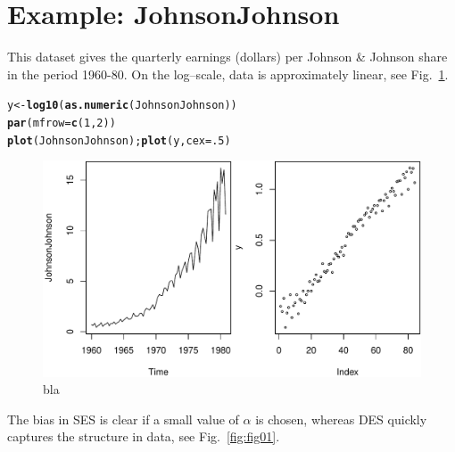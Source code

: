 \documentclass[10pt]{article}\usepackage[]{graphicx}\usepackage[]{color}
\makeatletter
\def\maxwidth{ %
  \ifdim\Gin@nat@width>\linewidth
    \linewidth
  \else
    \Gin@nat@width
  \fi
}
\newcommand{\hlnum}[1]{\textcolor[rgb]{0.686,0.059,0.569}{#1}}%
\newcommand{\hlstd}[1]{\textcolor[rgb]{0.345,0.345,0.345}{#1}}%
\newcommand{\hlkwb}[1]{\textcolor[rgb]{0.69,0.353,0.396}{#1}}%
\newcommand{\hlkwc}[1]{\textcolor[rgb]{0.333,0.667,0.333}{#1}}%
\newcommand{\hlkwd}[1]{\textcolor[rgb]{0.737,0.353,0.396}{\textbf{#1}}}%
\newenvironment{kframe}{%
 \def\at@end@of@kframe{}%
 \ifinner\ifhmode%
  \def\at@end@of@kframe{\end{minipage}}%
  \begin{minipage}{\columnwidth}%
 \fi\fi%
 \def\FrameCommand##1{\hskip\@totalleftmargin \hskip-\fboxsep
 \colorbox{shadecolor}{##1}\hskip-\fboxsep
     \hskip-\linewidth \hskip-\@totalleftmargin \hskip\columnwidth}%
 \MakeFramed {\advance\hsize-\width
   \@totalleftmargin\z@ \linewidth\hsize
   \@setminipage}}%
 {\par\unskip\endMakeFramed%
 \at@end@of@kframe}
\newenvironment{knitrout}{}{} %
\makeatother
\begin{document}
\section{Example: JohnsonJohnson}
\label{example:johnson}

This dataset gives the quarterly earnings (dollars) per Johnson \&
Johnson share in the period 1960-80. On the log--scale, data is approximately linear, see Fig.~\ref{fig:fig00}.

\begin{knitrout}
\color{fgcolor}\begin{kframe}
\begin{alltt}
\hlstd{y} \hlkwb{<-} \hlkwd{log10}\hlstd{(}\hlkwd{as.numeric}\hlstd{(JohnsonJohnson))}
\hlkwd{par}\hlstd{(}\hlkwc{mfrow}\hlstd{=}\hlkwd{c}\hlstd{(}\hlnum{1}\hlstd{,}\hlnum{2}\hlstd{))}
\hlkwd{plot}\hlstd{(JohnsonJohnson);} \hlkwd{plot}\hlstd{(y,} \hlkwc{cex}\hlstd{=}\hlnum{.5}\hlstd{)}
\end{alltt}
\end{kframe}\begin{figure}
\includegraphics[width=\maxwidth]{fig/graphfig00-1} \caption[bla]{bla}\label{fig:fig00}
\end{figure}


\end{knitrout}


The bias in SES is clear if a small value of $\alpha$ is chosen, whereas DES quickly captures the structure in data, see Fig.~\ref{fig:fig01}.
\end{document}
